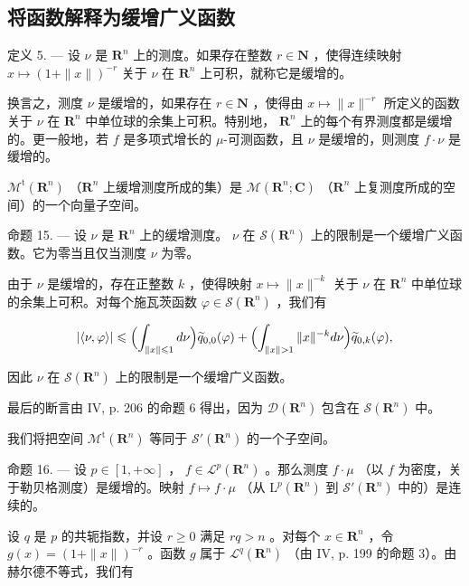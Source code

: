 \subsection{将函数解释为缓增广义函数}

定义 5. --- 设 \(\nu\) 是 \(\mathbf{R}^{n}\) 上的测度。如果存在整数 \(r \in \mathbf{N}\) ，使得连续映射 \(x \mapsto (1 + \|x\|)^{-r}\) 关于 \(\nu\) 在 \(\mathbf{R}^{n}\) 上可积，就称它是缓增的。

换言之，测度 \(\nu\) 是缓增的，如果存在 \(r \in \mathbf{N}\) ，使得由 \(x \mapsto \| x\|^{-r}\) 所定义的函数关于 \(\nu\) 在 \(\mathbf{R}^n\) 中单位球的余集上可积。特别地， \(\mathbf{R}^n\) 上的每个有界测度都是缓增的。更一般地，若 \(f\) 是多项式增长的 \(\mu\)-可测函数，且 \(\nu\) 是缓增的，则测度 \(f \cdot \nu\) 是缓增的。

\(\mathcal{M}^{\mathrm{t}}(\mathbf{R}^{n})\) （\(\mathbf{R}^{n}\) 上缓增测度所成的集）是 \(\mathcal{M}(\mathbf{R}^{n};\mathbf{C})\) （\(\mathbf{R}^{n}\) 上复测度所成的空间）的一个向量子空间。

命题 15. --- 设 \(\nu\) 是 \(\mathbf{R}^{n}\) 上的缓增测度。 \(\nu\) 在 \(\mathcal{S}(\mathbf{R}^{n})\) 上的限制是一个缓增广义函数。它为零当且仅当测度 \(\nu\) 为零。

由于 \(\nu\) 是缓增的，存在正整数 \(k\) ，使得映射 \(x \mapsto \| x\|^{-k}\) 关于 \(\nu\) 在 \(\mathbf{R}^n\) 中单位球的余集上可积。对每个施瓦茨函数 \(\varphi \in \mathcal{S}(\mathbf{R}^n)\) ，我们有

\[
| \langle \nu , \varphi \rangle | \leqslant \Bigl (\int_ {\| x \| \leqslant 1} d \nu \Bigr) \widetilde {q} _ {0, 0} (\varphi) + \Bigl (\int_ {\| x \| > 1} \| x \| ^ {- k} d \nu \Bigr) \widetilde {q} _ {0, k} (\varphi),
\]

因此 \(\nu\) 在 \(\mathcal{S}(\mathbf{R}^n)\) 上的限制是一个缓增广义函数。

最后的断言由 IV, p. 206 的命题 6 得出，因为 \(\mathcal{D}(\mathbf{R}^n)\) 包含在 \(\mathcal{S}(\mathbf{R}^n)\) 中。

我们将把空间 \(\mathcal{M}^{\mathrm{t}}(\mathbf{R}^{n})\) 等同于 \(\mathcal{S}'(\mathbf{R}^{n})\) 的一个子空间。

命题 16. --- 设 \(p \in [1, +\infty]\) ， \(f \in \mathcal{L}^{p}(\mathbf{R}^{n})\) 。那么测度 \(f \cdot \mu\) （以 \(f\) 为密度，关于勒贝格测度）是缓增的。映射 \(f \mapsto f \cdot \mu\) （从 \(\mathrm{L}^{p}(\mathbf{R}^{n})\) 到 \(\mathcal{S}'(\mathbf{R}^{n})\) 中的）是连续的。

设 \(q\) 是 \(p\) 的共轭指数，并设 \(r \geqslant 0\) 满足 \(rq > n\) 。对每个 \(x \in \mathbf{R}^n\) ，令 \(g(x) = (1 + \|x\|)^{-r}\) 。函数 \(g\) 属于 \(\mathcal{L}^q(\mathbf{R}^n)\) （由 IV, p. 199 的命题 3）。由赫尔德不等式，我们有


